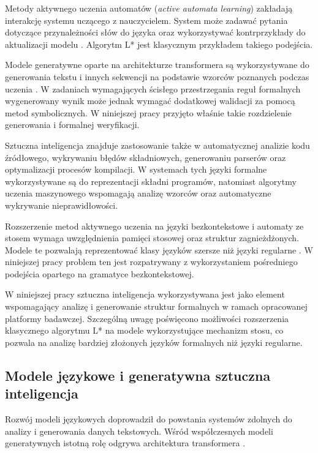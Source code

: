 \documentclass[12pt]{article}
\begin{document}
Metody aktywnego uczenia automatów (\textit{active automata learning}) zakładają interakcję systemu uczącego z nauczycielem. System może zadawać pytania dotyczące przynależności słów do języka oraz wykorzystywać kontrprzykłady do aktualizacji modelu \cite{angluin1987}. Algorytm L* jest klasycznym przykładem takiego podejścia.

Modele generatywne oparte na architekturze transformera są wykorzystywane do generowania tekstu i innych sekwencji na podstawie wzorców poznanych podczas uczenia \cite{vaswani2017,brown2020}. W zadaniach wymagających ścisłego przestrzegania reguł formalnych wygenerowany wynik może jednak wymagać dodatkowej walidacji za pomocą metod symbolicznych. W niniejszej pracy przyjęto właśnie takie rozdzielenie generowania i formalnej weryfikacji.

Sztuczna inteligencja znajduje zastosowanie także w automatycznej analizie kodu źródłowego, wykrywaniu błędów składniowych, generowaniu parserów oraz optymalizacji procesów kompilacji. W systemach tych języki formalne wykorzystywane są do reprezentacji składni programów, natomiast algorytmy uczenia maszynowego wspomagają analizę wzorców oraz automatyczne wykrywanie nieprawidłowości.

Rozszerzenie metod aktywnego uczenia na języki bezkontekstowe i automaty ze stosem wymaga uwzględnienia pamięci stosowej oraz struktur zagnieżdżonych. Modele te pozwalają reprezentować klasy języków szersze niż języki regularne \cite{hopcroft2007,sipser2012}. W niniejszej pracy problem ten jest rozpatrywany z wykorzystaniem pośredniego podejścia opartego na gramatyce bezkontekstowej.

W niniejszej pracy sztuczna inteligencja wykorzystywana jest jako element wspomagający analizę i generowanie struktur formalnych w ramach opracowanej platformy badawczej. Szczególną uwagę poświęcono możliwości rozszerzenia klasycznego algorytmu L* na modele wykorzystujące mechanizm stosu, co pozwala na analizę bardziej złożonych języków formalnych niż języki regularne.


\subsection{Modele językowe i generatywna sztuczna inteligencja} \cite{vaswani2017,brown2020,zhao2023}

Rozwój modeli językowych doprowadził do powstania systemów zdolnych do analizy i generowania danych tekstowych. Wśród współczesnych modeli generatywnych istotną rolę odgrywa architektura transformera \cite{vaswani2017,brown2020,zhao2023}.
\end{document}
